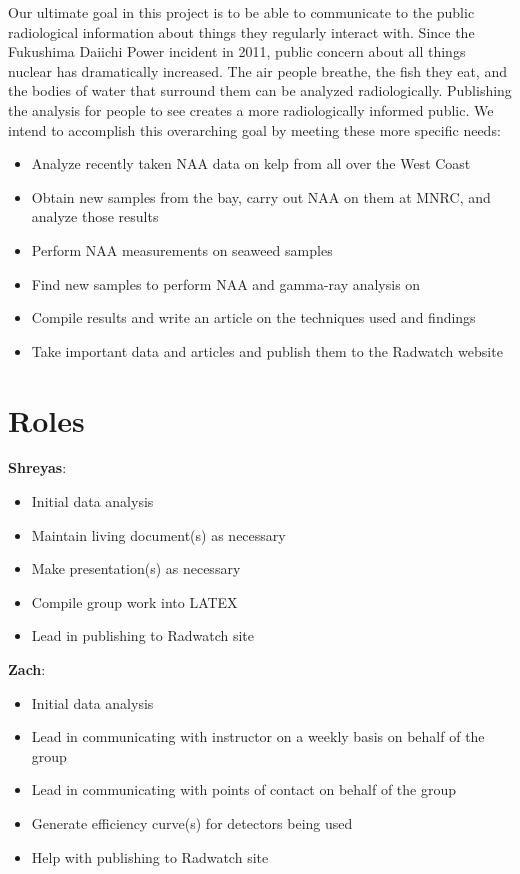 \documentclass[]{article}
\begin{document}
Our ultimate goal in this project is to be able to communicate to the public radiological information about things they regularly interact with.  Since the Fukushima Daiichi Power incident in 2011, public concern about all things nuclear has dramatically increased.  The air people breathe, the fish they eat, and the bodies of water that surround them can be analyzed radiologically.  Publishing the analysis for people to see creates a more radiologically informed public.  We intend to accomplish this overarching goal by meeting these more specific needs:
\begin{itemize}
\item Analyze recently taken NAA data on kelp from all over the West Coast
\item Obtain new samples from the bay, carry out NAA on them at MNRC, and analyze those results
\item Perform NAA measurements on seaweed samples
\item Find new samples to perform NAA and gamma-ray analysis on
\item Compile results and write an article on the techniques used and findings
\item Take important data and articles and publish them to the Radwatch website
\end{itemize}

\section{Roles}

\textbf{Shreyas}:
\begin{itemize}
\item Initial data analysis
\item Maintain living document(s) as necessary 
\item Make presentation(s) as necessary
\item Compile group work into LATEX
\item Lead in publishing to Radwatch site
\end{itemize}

\textbf{Zach}: 
\begin{itemize}
\item Initial data analysis
\item Lead in communicating with instructor on a weekly basis on behalf of the group
\item Lead in communicating with points of contact on behalf of the group
\item Generate efficiency curve(s) for detectors being used
\item Help with publishing to Radwatch site
\end{itemize}
\end{document}

